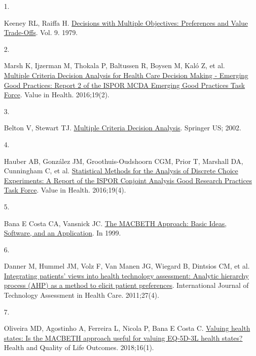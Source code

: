\documentclass[
  letterpaper,
  DIV=11,
  numbers=noendperiod]{scrartcl}
\newlength{\cslhangindent}
\newlength{\csllabelwidth}
\newenvironment{CSLReferences}[2] %
 {\begin{list}{}{%
  \setlength{\itemindent}{0pt}
  \setlength{\leftmargin}{0pt}
  \setlength{\parsep}{0pt}
  \ifodd #1
   \setlength{\leftmargin}{\cslhangindent}
   \setlength{\itemindent}{-1\cslhangindent}
  \fi
  \setlength{\itemsep}{#2\baselineskip}}}
 {\end{list}}
\newcommand{\CSLLeftMargin}[1]{\parbox[t]{\csllabelwidth}{\strut#1\strut}}
\newcommand{\CSLRightInline}[1]{\parbox[t]{\linewidth - \csllabelwidth}{\strut#1\strut}}
\begin{document}
\label{refs}
\begin{CSLReferences}{0}{1}
\CSLLeftMargin{1. }%
\CSLRightInline{Keeney RL, Raiffa H.
\href{https://doi.org/10.1109/TSMC.1979.4310245}{{Decisions with
Multiple Objectives: Preferences and Value Trade-Offs}}. Vol. 9. 1979. }

\CSLLeftMargin{2. }%
\CSLRightInline{Marsh K, Ijzerman M, Thokala P, Baltussen R, Boysen M,
Kaló Z, et al.
\href{https://doi.org/10.1016/j.jval.2015.12.016}{{Multiple Criteria
Decision Analysis for Health Care Decision Making - Emerging Good
Practices: Report 2 of the ISPOR MCDA Emerging Good Practices Task
Force}}. Value in Health. 2016;19(2). }

\CSLLeftMargin{3. }%
\CSLRightInline{Belton V, Stewart TJ.
\href{https://doi.org/10.1007/978-1-4615-1495-4}{{Multiple Criteria
Decision Analysis}}. Springer US; 2002. }

\CSLLeftMargin{4. }%
\CSLRightInline{Hauber AB, González JM, Groothuis-Oudshoorn CGM, Prior
T, Marshall DA, Cunningham C, et al.
\href{https://doi.org/10.1016/j.jval.2016.04.004}{{Statistical Methods
for the Analysis of Discrete Choice Experiments: A Report of the ISPOR
Conjoint Analysis Good Research Practices Task Force}}. Value in Health.
2016;19(4). }

\CSLLeftMargin{5. }%
\CSLRightInline{Bana E Costa CA, Vansnick JC.
\href{https://doi.org/10.1007/978-94-017-0647-6\%7B/_\%7D9}{{The MACBETH
Approach: Basic Ideas, Software, and an Application}}. In 1999. }

\CSLLeftMargin{6. }%
\CSLRightInline{Danner M, Hummel JM, Volz F, Van Manen JG, Wiegard B,
Dintsios CM, et al.
\href{https://doi.org/10.1017/S0266462311000523}{{Integrating patients'
views into health technology assessment: Analytic hierarchy process
(AHP) as a method to elicit patient preferences}}. International Journal
of Technology Assessment in Health Care. 2011;27(4). }

\CSLLeftMargin{7. }%
\CSLRightInline{Oliveira MD, Agostinho A, Ferreira L, Nicola P, Bana E
Costa C. \href{https://doi.org/10.1186/s12955-018-1056-y}{{Valuing
health states: Is the MACBETH approach useful for valuing EQ-5D-3L
health states?}} Health and Quality of Life Outcomes. 2018;16(1). }


\end{CSLReferences}
\end{document}
